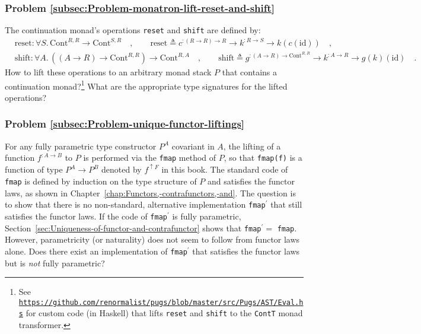 \subsubsection{Problem \label{subsec:Problem-monatron-lift-reset-and-shift}\ref{subsec:Problem-monatron-lift-reset-and-shift}}

The continuation monad\textsf{'}s operations \lstinline!reset! and \lstinline!shift!
are defined by:
\begin{align*}
 & \text{reset}:\forall S.\,\text{Cont}^{R,R}\rightarrow\text{Cont}^{S,R}\quad,\quad\quad\text{reset}\triangleq c^{:\left(R\rightarrow R\right)\rightarrow R}\rightarrow k^{:R\rightarrow S}\rightarrow k(c(\text{id}))\quad,\\
 & \text{shift}:\forall A.\,((A\rightarrow R)\rightarrow\text{Cont}^{R,R})\rightarrow\text{Cont}^{R,A}\quad,\quad\quad\text{shift}\triangleq g^{:\left(A\rightarrow R\right)\rightarrow\text{Cont}^{R,R}}\rightarrow k^{:A\rightarrow R}\rightarrow g(k)(\text{id})\quad.
\end{align*}
How to lift these operations to an arbitrary monad stack $P$ that
contains a continuation monad?\footnote{See \texttt{\href{https://github.com/renormalist/pugs/blob/master/src/Pugs/AST/Eval.hs}{https://github.com/renormalist/pugs/blob/master/src/Pugs/AST/Eval.hs}}
for custom code (in Haskell) that lifts \lstinline!reset! and \lstinline!shift!
to the \lstinline!ContT! monad transformer.} What are the appropriate type signatures for the lifted operations?

\subsubsection{Problem \label{subsec:Problem-unique-functor-liftings}\ref{subsec:Problem-unique-functor-liftings}}

For any fully parametric type constructor $P^{A}$ covariant in $A$,
the lifting of a function $f^{:A\rightarrow B}$ to $P$ is performed
via the \lstinline!fmap! method of $P$, so that \lstinline!fmap(f)!
is a function of type $P^{A}\rightarrow P^{B}$ denoted by $f^{\uparrow F}$
in this book. The standard code of \lstinline!fmap! is defined by
induction on the type structure of $P$ and satisfies the functor
laws, as shown in Chapter~\ref{chap:Functors,-contrafunctors,-and}.
The question is to show that there is no non-standard, alternative
implementation \lstinline!fmap!$^{\prime}$ that still satisfies
the functor laws. If the code of \lstinline!fmap!$^{\prime}$ is
fully parametric, Section~\ref{sec:Uniqueness-of-functor-and-contrafunctor}
shows that \lstinline!fmap!$^{\prime}=$ \lstinline!fmap!. However,
parametricity (or naturality) does not seem to follow from functor
laws alone. Does there exist an implementation of \lstinline!fmap!$^{\prime}$
that satisfies the functor laws but is \emph{not} fully parametric?
